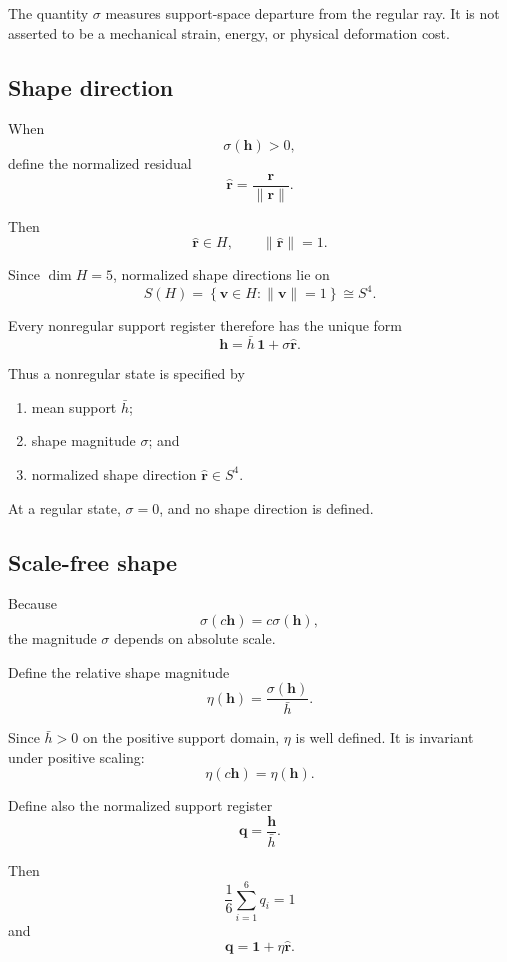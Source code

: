 The quantity \(\sigma\) measures support-space departure from the regular
ray. It is not asserted to be a mechanical strain, energy, or physical
deformation cost.

\subsection{Shape direction}

When
\[
\sigma(\mathbf h)>0,
\]
define the normalized residual
\[
\widehat{\mathbf r}
=
\frac{\mathbf r}{\|\mathbf r\|}.
\]

Then
\[
\widehat{\mathbf r}\in H,
\qquad
\|\widehat{\mathbf r}\|=1.
\]

Since \(\dim H=5\), normalized shape directions lie on
\[
S(H)
=
\left\{
\mathbf v\in H:
\|\mathbf v\|=1
\right\}
\cong S^4.
\]

Every nonregular support register therefore has the unique form
\[
\mathbf h
=
\bar h\,\mathbf 1
+
\sigma\widehat{\mathbf r}.
\]

Thus a nonregular state is specified by

\begin{enumerate}
\item mean support \(\bar h\);
\item shape magnitude \(\sigma\); and
\item normalized shape direction \(\widehat{\mathbf r}\in S^4\).
\end{enumerate}

At a regular state, \(\sigma=0\), and no shape direction is defined.

\subsection{Scale-free shape}

Because
\[
\sigma(c\mathbf h)=c\sigma(\mathbf h),
\]
the magnitude \(\sigma\) depends on absolute scale.

Define the relative shape magnitude
\[
\eta(\mathbf h)
=
\frac{\sigma(\mathbf h)}{\bar h}.
\]

Since \(\bar h>0\) on the positive support domain, \(\eta\) is well defined.
It is invariant under positive scaling:
\[
\eta(c\mathbf h)
=
\eta(\mathbf h).
\]

Define also the normalized support register
\[
\mathbf q
=
\frac{\mathbf h}{\bar h}.
\]

Then
\[
\frac{1}{6}\sum_{i=1}^{6}q_i=1
\]
and
\[
\mathbf q
=
\mathbf 1+\eta\widehat{\mathbf r}.
\]

